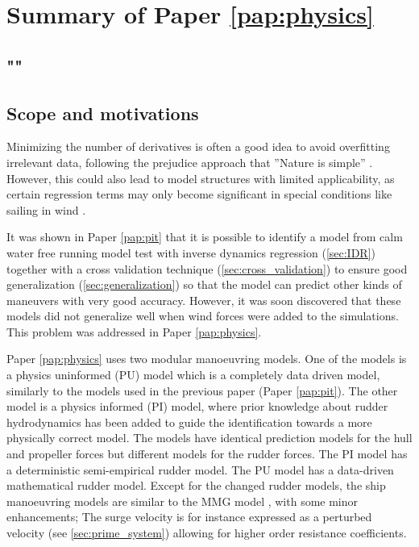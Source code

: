 \section{Summary of Paper \ref{pap:physics}}
\subsection*{""}
\subsection*{Scope and motivations}

\textcolor{ref}{
Minimizing the number of derivatives is often a good idea to avoid overfitting irrelevant data, following the prejudice approach that ''Nature is simple'' \cite{ljungPerspectivesSystemIdentification2010}. However, this could also lead to model structures with limited applicability, as certain regression terms may only become significant in special conditions like sailing in wind \cite{abkowitzMEASUREMENTHYDRODYNAMICCHARACTERISTICS1980}.
}

It was shown in Paper \ref{pap:pit} that it is possible to identify a model from calm water free running model test with inverse dynamics regression (\autoref{sec:IDR}) together with a cross validation technique (\autoref{sec:cross_validation}) to ensure good generalization (\autoref{sec:generalization}) so that the model can predict other kinds of maneuvers with very good accuracy. However, it was soon discovered that these models did not generalize well when wind forces were added to the simulations. This problem was addressed in Paper \ref{pap:physics}.

Paper \ref{pap:physics} uses two modular manoeuvring models. One of the models is a physics uninformed (PU) model which is a completely data driven model, similarly to the models used in the previous paper (Paper \ref{pap:pit}).
The other model is a physics informed (PI) model, where prior knowledge about rudder hydrodynamics has been added to guide the identification towards a more physically correct model. 
The models have identical prediction models for the hull and propeller forces but different models for the rudder forces. The PI model has a deterministic semi-empirical rudder model. The PU model has a data-driven mathematical rudder model. Except for the changed rudder models, the ship manoeuvring models are similar to the MMG model \cite{yasukawaIntroductionMMGStandard2015}, with some minor enhancements; The surge velocity is for instance expressed as a perturbed velocity (see \autoref{sec:prime_system}) allowing for higher order resistance coefficients.

